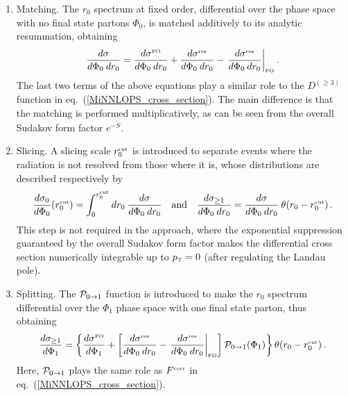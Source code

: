 \documentclass[11pt,a4paper]{article}
\begin{document}
\begin{enumerate}
\item Matching. The $r_0$ spectrum at fixed order, differential over
  the phase space with no final state partons $\Phi_0$, is matched
  additively to its analytic resummation, obtaining
  \begin{equation}
    \frac{d\sigma}{d\Phi_0 \> dr_0} =
    \frac{d\sigma^{\scriptscriptstyle\rm FO}}{d\Phi_0 \> dr_0} +
    \frac{d\sigma^{\scriptscriptstyle\rm res}}{d\Phi_0 \> dr_0} -
    \left. \frac{d\sigma^{\scriptscriptstyle\rm res}}{d\Phi_0 \>
      dr_0}\right|_{\scriptscriptstyle\rm FO}.
  \end{equation}
  The last two terms of the above equations play a similar role to the
  $D^{(\geq 3)}$ function in eq.~(\ref{MiNNLOPS_cross_section}). The
  main difference is that the \minnlo{} matching is performed
  multiplicatively, as can be seen from the overall Sudakov form
  factor $e^{-\tilde{S}}$.
\item Slicing. A slicing scale $r_0^{\scriptscriptstyle\rm cut}$ is
  introduced to separate events where the radiation is not resolved
  from those where it is, whose distributions are described
  respectively by
  \begin{equation}
    \frac{d\sigma_0}{d\Phi_0}\!\left(r_0^{\scriptscriptstyle\rm
      cut}\right) = \int_0^{r_0^{\scriptscriptstyle\rm cut}} dr_0 \>
    \frac{d\sigma}{d\Phi_0 \> dr_0}
    \quad \mbox{and} \quad
    \frac{d\sigma_{\geq 1}}{d\Phi_0 \> dr_0} = \frac{d\sigma}{d\Phi_0
      \> dr_0} \> \theta\!\left(r_0 - r_0^{\scriptscriptstyle\rm
      cut}\right).
  \end{equation}
  This step is not required in the \minnlo{} approach, where the
  exponential suppression guaranteed by the overall Sudakov form
  factor makes the differential cross section numerically integrable
  up to $p_{\scriptscriptstyle\rm T} = 0$ (after regulating the Landau
  pole).
\item Splitting. The ${\cal P}_{0 \to 1}$ function is introduced to
  make the $r_0$ spectrum differential over the $\Phi_1$ phase space
  with one final state parton, thus obtaining
  \begin{equation}
    \frac{d\sigma_{\geq 1}}{d\Phi_1} =
    \left\{\frac{d\sigma^{\scriptscriptstyle\rm FO}}{d\Phi_1} +
    \left[\frac{d\sigma^{\scriptscriptstyle\rm res}}{d\Phi_0 \> dr_0}
      - \left. \frac{d\sigma^{\scriptscriptstyle\rm res}}{d\Phi_0 \>
        dr_0}\right|_{\scriptscriptstyle\rm FO} \right] {\cal P}_{0
      \to 1}\!\left(\Phi_1\right)\right\} \theta\!\left(r_0 -
    r_0^{\scriptscriptstyle\rm cut}\right).
  \end{equation}
  Here, ${\cal P}_{0 \to 1}$ plays the same role as
  $F^{\scriptscriptstyle\rm corr}$ in
  eq.~(\ref{MiNNLOPS_cross_section}).
\end{enumerate}
\end{document}
